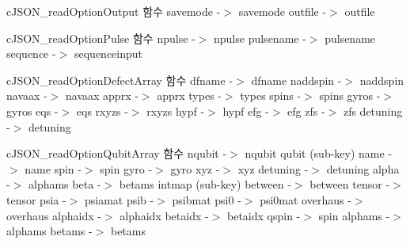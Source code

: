 c\-J\-S\-O\-N\-\_\-read\-Option\-Output 함수 savemode -\/$>$ savemode outfile -\/$>$ outfile

c\-J\-S\-O\-N\-\_\-read\-Option\-Pulse 함수 npulse -\/$>$ npulse pulsename -\/$>$ pulsename sequence -\/$>$ sequenceinput

c\-J\-S\-O\-N\-\_\-read\-Option\-Defect\-Array 함수 dfname -\/$>$ dfname naddspin -\/$>$ naddspin navaax -\/$>$ navaax apprx -\/$>$ apprx types -\/$>$ types spins -\/$>$ spins gyros -\/$>$ gyros eqs -\/$>$ eqs rxyzs -\/$>$ rxyzs hypf -\/$>$ hypf efg -\/$>$ efg zfs -\/$>$ zfs detuning -\/$>$ detuning

c\-J\-S\-O\-N\-\_\-read\-Option\-Qubit\-Array 함수 nqubit -\/$>$ nqubit qubit (sub-\/key) name -\/$>$ name spin -\/$>$ spin gyro -\/$>$ gyro xyz -\/$>$ xyz detuning -\/$>$ detuning alpha -\/$>$ alphams beta -\/$>$ betams intmap (sub-\/key) between -\/$>$ between tensor -\/$>$ tensor psia -\/$>$ psiamat psib -\/$>$ psibmat psi0 -\/$>$ psi0mat overhaus -\/$>$ overhaus alphaidx -\/$>$ alphaidx betaidx -\/$>$ betaidx qspin -\/$>$ spin alphams -\/$>$ alphams betams -\/$>$ betams 